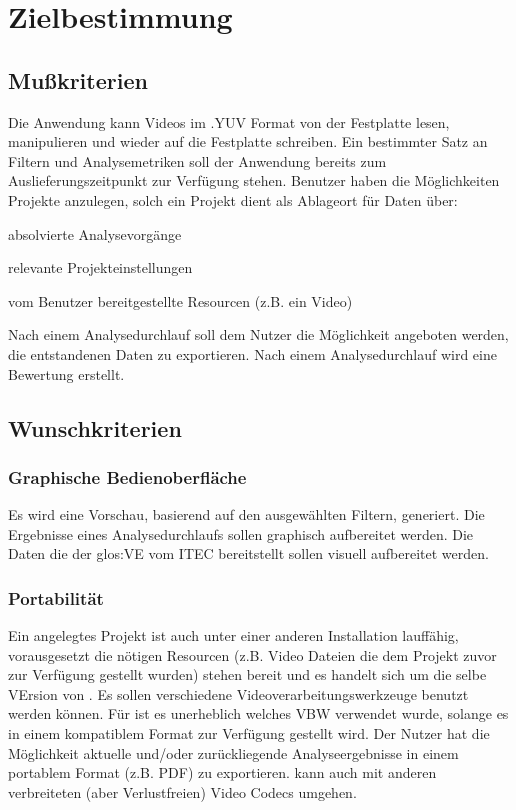 \chapter{Zielbestimmung}

\section{Mußkriterien}
\setcounter{counterKriterien}{0}
 Die Anwendung kann Videos im .YUV Format von der Festplatte lesen, manipulieren und wieder auf die Festplatte schreiben.
 Ein bestimmter Satz an Filtern und Analysemetriken soll der Anwendung bereits zum Auslieferungszeitpunkt zur Verfügung stehen.
 Benutzer haben die Möglichkeiten Projekte anzulegen, solch ein Projekt dient als Ablageort für Daten über:
\begin{compactitem}
\item absolvierte Analysevorgänge
\item relevante Projekteinstellungen
\item vom Benutzer bereitgestellte Resourcen (z.B. ein Video)
\end{compactitem}
 Nach einem Analysedurchlauf soll dem Nutzer die Möglichkeit angeboten werden, die entstandenen Daten zu exportieren.
 Nach einem Analysedurchlauf wird eine Bewertung erstellt.

\section{Wunschkriterien}
\setcounter{counterKriterien}{0}
\subsection{Graphische Bedienoberfläche}
 Es wird eine Vorschau, basierend auf den ausgewählten Filtern, generiert.
 Die Ergebnisse eines Analysedurchlaufs sollen graphisch aufbereitet werden.
 Die Daten die der \gls{glos:VE} vom \gls{ITEC}  bereitstellt sollen visuell aufbereitet werden.
\subsection{Portabilität}
 Ein angelegtes Projekt ist auch unter einer anderen \projektTitel Installation lauffähig, vorausgesetzt die nötigen Resourcen (z.B. Video Dateien die dem Projekt zuvor zur Verfügung gestellt wurden) stehen bereit und es handelt sich um die selbe VErsion von \projektTitel.
 Es sollen verschiedene Videoverarbeitungswerkzeuge benutzt werden können.
 Für \projektTitel ist es unerheblich welches \gls{VBW} verwendet wurde, solange es in einem
			kompatiblem Format zur Verfügung gestellt wird.
 Der Nutzer hat die Möglichkeit aktuelle und/oder zurückliegende Analyseergebnisse in einem
			portablem Format (z.B. PDF) zu exportieren.
 \projektTitel kann auch mit anderen verbreiteten (aber Verlustfreien) Video Codecs umgehen.
